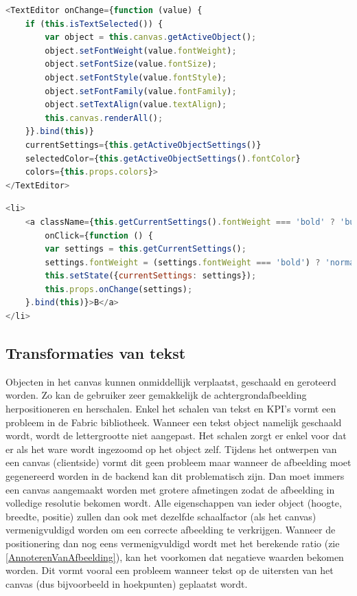 \begin{lstlisting}[caption={Theme component - Text editor},label=lst:ThemeComponentTextEditor,language=javascript]
<TextEditor onChange={function (value) {
	if (this.isTextSelected()) {
		var object = this.canvas.getActiveObject();
		object.setFontWeight(value.fontWeight);
		object.setFontSize(value.fontSize);
		object.setFontStyle(value.fontStyle);
		object.setFontFamily(value.fontFamily);
		object.setTextAlign(value.textAlign);
		this.canvas.renderAll();
	}}.bind(this)}
	currentSettings={this.getActiveObjectSettings()}
	selectedColor={this.getActiveObjectSettings().fontColor}
	colors={this.props.colors}>
</TextEditor>
\end{lstlisting}

\begin{lstlisting}[caption={TextEditor component - toggle bold},label=lst:TextEditorComponentBold,language=javascript]
<li>
	<a className={this.getCurrentSettings().fontWeight === 'bold' ? 'button primary' : 'button'}
		onClick={function () {
		var settings = this.getCurrentSettings();
		settings.fontWeight = (settings.fontWeight === 'bold') ? 'normal' : 'bold';
		this.setState({currentSettings: settings});
		this.props.onChange(settings);
	}.bind(this)}>B</a>
</li>
\end{lstlisting}


\subsection{Transformaties van tekst}
Objecten in het canvas kunnen onmiddellijk verplaatst, geschaald en geroteerd worden. Zo kan de gebruiker zeer gemakkelijk de achtergrondafbeelding herpositioneren en herschalen. Enkel het schalen van tekst en KPI's vormt een probleem in de Fabric bibliotheek. Wanneer een tekst object namelijk geschaald wordt, wordt de lettergrootte niet aangepast. Het schalen zorgt er enkel voor dat er als het ware wordt ingezoomd op het object zelf. Tijdens het ontwerpen van een canvas (clientside) vormt dit geen probleem maar wanneer de afbeelding moet gegenereerd worden in de backend kan dit problematisch zijn. Dan moet immers een canvas aangemaakt worden met grotere afmetingen zodat de afbeelding in volledige resolutie bekomen wordt.  Alle eigenschappen van ieder object (hoogte, breedte, positie) zullen dan ook met dezelfde schaalfactor (als het canvas) vermenigvuldigd worden om een correcte afbeelding te verkrijgen. Wanneer de positionering dan nog eens vermenigvuldigd wordt met het berekende ratio (zie \ref{AnnoterenVanAfbeelding}), kan het voorkomen dat negatieve waarden bekomen worden. Dit vormt vooral een probleem wanneer tekst op de uitersten van het canvas (dus bijvoorbeeld in hoekpunten) geplaatst wordt. 


